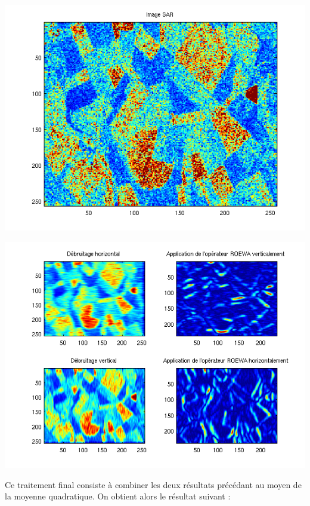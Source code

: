 \documentclass[a4paper,11pt]{article}
\newcommand{\FSource}[1]{%
  
  }
\begin{document}
\vspace{0.5cm}
\FSource{matlab4/1.m}
\vspace{0.5cm}
\includegraphics[width=15cm]{capture4/partie4_02.png}
\vspace{0.5cm}
\FSource{matlab4/2.m}
\includegraphics[width=15cm]{capture4/partie4_06.png}
\vspace{0.5cm}
\FSource{matlab4/3.m}

Ce traitement final consiste à combiner les deux résultats précédant au moyen
de la moyenne quadratique. On obtient alors le résultat suivant :
\end{document}
